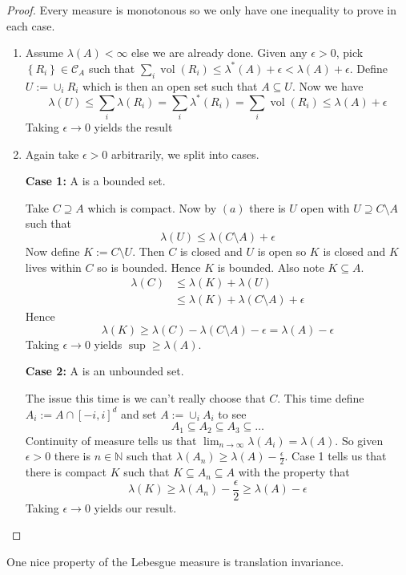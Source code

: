 \documentclass[11pt]{article}
\newcommand{\defeq}{:=}
\DeclareMathOperator\vol{vol}
\newcommand{\N}{\mathbb{N}}
\begin{document}
\begin{proof}
Every measure is monotonous so we only have one inequality to prove in each case.
\begin{enumerate}[label=(\alph*)]
	\item Assume $\lambda(A)< \infty$ else we are already done.
		Given any $\epsilon>0$, pick $\left\{R_i\right\}\in\mathcal{C}_A$ such that $\sum_i\vol(R_i)\leq\lambda^*(A)+\epsilon < \lambda(A) + \epsilon$.
		Define $U\defeq\cup_i R_i$ which is then an open set such that $A\subseteq U$.
		Now we have
		\[
			\lambda(U)\leq\sum_i\lambda(R_i)=\sum_i\lambda^*(R_i)=\sum_i\vol(R_i)\leq\lambda(A)+\epsilon
		\]
		Taking $\epsilon\to 0$ yields the result
	\item Again take $\epsilon >0$ arbitrarily, we split into cases.

		\textbf{Case 1:} A is a bounded set.

		Take $C\supseteq A$ which is compact. Now by $(a)$ there is $U$ open with $U\supseteq C\setminus A$ such that
		\[
			\lambda(U) \leq \lambda(C\setminus A) + \epsilon
		\]
		Now define $K\defeq C\setminus U$.
		Then $C$ is closed and $U$ is open so $K$ is closed and $K$ lives within $C$ so is bounded.
		Hence $K$ is bounded.
		Also note $K\subseteq A$.
		\begin{align*}
			\lambda(C)&\leq\lambda(K)  + \lambda(U) \\
					&\leq \lambda(K) + \lambda(C\setminus A) + \epsilon
		\end{align*}
		Hence
		\[
			\lambda(K)\geq \lambda(C) - \lambda(C\setminus A) - \epsilon = \lambda(A) - \epsilon
		\]
		Taking $\epsilon\to 0$ yields $\sup\geq \lambda(A)$.

		\textbf{Case 2:} A is an unbounded set.

		The issue this time is we can't really choose that $C$.
		This time define $A_i\defeq A \cap [-i, i]^d$ and set $A\defeq\cup_i A_i$ to see
		\[
			A_1 \subseteq A_2 \subseteq A_3 \subseteq \dots
		\]
		Continuity of measure tells us that $\lim_{n\to\infty}\lambda (A_i)=\lambda (A)$.
		So given $\epsilon >0$ there is $n\in\N$ such that $\lambda (A_n)\geq \lambda (A) - \frac{\epsilon}{2}$.
		Case 1 tells us that there is compact $K$ such that $K\subseteq A_n\subseteq A$ with the property that
		\[
			\lambda(K)\geq\lambda(A_n)-\frac{\epsilon}{2}\geq\lambda(A) - \epsilon
		\]
		Taking $\epsilon\to 0$ yields our result.
\end{enumerate}
\end{proof}
One nice property of the Lebesgue measure is translation invariance.
\end{document}
